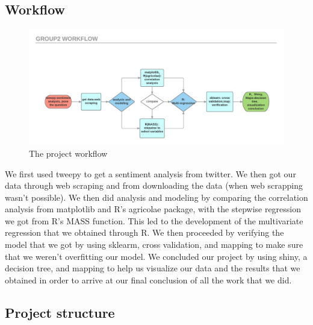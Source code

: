 \documentclass{article}
\begin{document}
{\subsection{Workflow}




\begin{figure}[hb]
  \centering
    \includegraphics[scale=0.5]{group2workflowv2}
  \caption{The project workflow}

\end{figure}

We first used tweepy to get a sentiment analysis from twitter. We then got our data through web scraping and from downloading the data (when web scrapping wasn't possible). We then did analysis and modeling by comparing the correlation analysis from matplotlib and R's agricolae package, with the stepwise regression we got from R's MASS function. This led to the development of the multivariate regression that we obtained through R. We then proceeded by verifying the model that we got by using sklearm, cross validation, and mapping to make sure that we weren't overfitting our model. We concluded our project by using shiny, a decision tree, and mapping to help us visualize our data and the results that we obtained in order to arrive at our final conclusion of all the work that we did.


\subsection{Project structure}

}
\end{document}
